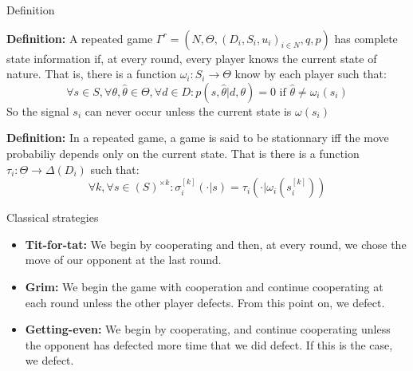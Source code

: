 \begin{frame}{Definition}

\textbf{Definition: }A repeated game $\Gamma^r = (N,\Theta, (D_i,S_i,u_i)_{i\in N},q,p)$ has \alert{complete state information} if, at every round, every player knows the current state of nature. That is, there is a function $\omega_i:S_i \rightarrow \Theta$ know by each player such that:
\begin{equation*}
	\forall s \in S, \forall \theta, \hat{\theta} \in \Theta, \forall d \in D : p(s,\hat{\theta} | d,\theta) = 0 \text{ if } \hat{\theta} \neq \omega_i(s_i)
\end{equation*}
So the signal $s_i$ can never occur unless the current state is $\omega(s_i)$

\pause

\textbf{Definition: }In a repeated game, a game is said to be \alert{stationnary} iff the move probabiliy depends only on the current state. That is there is a function $\tau_i : \Theta \rightarrow \Delta(D_i)$ such that:
\begin{equation*}
	\forall k, \forall s \in (S)^{\times k} : \sigma_i^{[k]}(\cdot | s) = \tau_i(\cdot | \omega_i(s_i^{[k]}))
\end{equation*}
\end{frame}

\begin{frame}{Classical strategies}
\begin{itemize}
	\item \textbf{Tit-for-tat:} We begin by cooperating and then, at every round, we chose the move of our opponent at the last round.
	\item \textbf{Grim:} We begin the game with cooperation and continue cooperating at each round unless the other player defects. From this point on, we defect.
	\item \textbf{Getting-even:} We begin by cooperating, and continue cooperating unless the opponent has defected more time that we did defect. If this is the case, we defect.
\end{itemize}
\end{frame}

